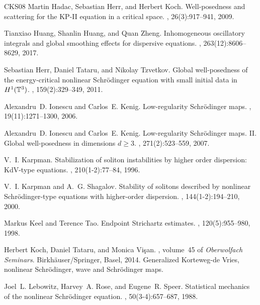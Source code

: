 \documentclass[10pt,leqno]{amsart}
\numberwithin{equation}{section}
\begin{document}
\begin{thebibliography}{CKS{\etalchar{+}}08}
Martin Hadac, Sebastian Herr, and Herbert Koch.
\newblock Well-posedness and scattering for the {KP}-{II} equation in a
  critical space.
,
  26(3):917--941, 2009.

Tianxiao Huang, Shanlin Huang, and Quan Zheng.
\newblock Inhomogeneous oscillatory integrals and global smoothing effects for
  dispersive equations.
, 263(12):8606--8629, 2017.

Sebastian Herr, Daniel Tataru, and Nikolay Tzvetkov.
\newblock Global well-posedness of the energy-critical nonlinear
  {S}chr\"{o}dinger equation with small initial data in {$H^1(\Bbb T^3)$}.
, 159(2):329--349, 2011.

Alexandru~D. Ionescu and Carlos~E. Kenig.
\newblock Low-regularity {S}chr\"{o}dinger maps.
, 19(11):1271--1300, 2006.

Alexandru~D. Ionescu and Carlos~E. Kenig.
\newblock Low-regularity {S}chr\"{o}dinger maps. {II}. {G}lobal well-posedness
  in dimensions {$d\geq 3$}.
, 271(2):523--559, 2007.

V.~I. Karpman.
\newblock Stabilization of soliton instabilities by higher order dispersion:
  {K}d{V}-type equations.
, 210(1-2):77--84, 1996.

V.~I. Karpman and A.~G. Shagalov.
\newblock Stability of solitons described by nonlinear {S}chr\"{o}dinger-type
  equations with higher-order dispersion.
, 144(1-2):194--210, 2000.

Markus Keel and Terence Tao.
\newblock Endpoint {S}trichartz estimates.
, 120(5):955--980, 1998.

Herbert Koch, Daniel Tataru, and Monica Vi\c{s}an.
, volume~45 of {\em
  Oberwolfach Seminars}.
\newblock Birkh\"{a}user/Springer, Basel, 2014.
\newblock Generalized Korteweg-de Vries, nonlinear Schr\"{o}dinger, wave and
  Schr\"{o}dinger maps.

Joel~L. Lebowitz, Harvey~A. Rose, and Eugene~R. Speer.
\newblock Statistical mechanics of the nonlinear {S}chr\"{o}dinger equation.
, 50(3-4):657--687, 1988.


\end{thebibliography}
\end{document}
